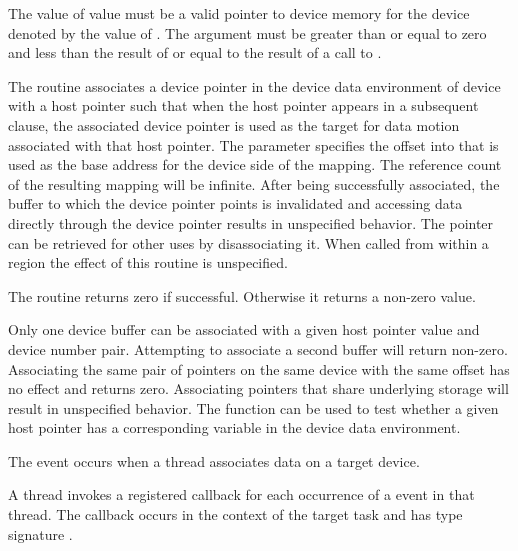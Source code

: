 \constraints
The value of  value must be a valid pointer to device
memory for the device denoted by the value of . The 
 argument must be greater than or equal to zero and 
less than the result of  or equal to the 
result of a call to .

\effect
The  routine associates a device pointer
in the device data environment of device 
with a host pointer such that when the host pointer appears in a subsequent
 clause, the associated device pointer is used as the target for
data motion associated with that host pointer.  The 
parameter specifies the offset into  that is used as the
base address for the device side of the mapping. The reference count of the
resulting mapping will be infinite.  After being successfully associated, the
buffer to which the device pointer points is invalidated and accessing data
directly through the device pointer results in unspecified behavior.  The
pointer can be retrieved for other uses by disassociating it.
When called from within a  region
the effect of this routine is unspecified.

The routine returns zero if successful. Otherwise it returns a non-zero value.

Only one device buffer can be associated with a given host pointer value and
device number pair. Attempting to associate a second buffer will return
non-zero. Associating the same pair of pointers on the same device with the
same offset has no effect and returns zero.  Associating pointers that share
underlying storage will result in unspecified behavior. The
 function can be used to test whether a given
host pointer has a corresponding variable in the device data environment.

\events
The  event occurs when a thread associates 
data on a target device.

\tools
A thread invokes a registered 
callback for each occurrence of a  event in 
that thread. The callback occurs in the context of the target task and
has type signature .

